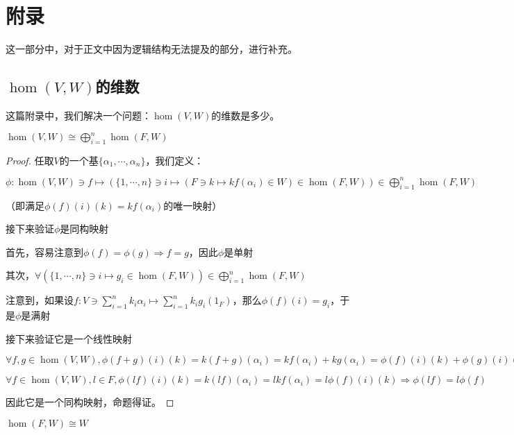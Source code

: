 \documentclass[12pt, a4paper, oneside, UTF8]{ctexbook}
\begin{document}
	\else
	\fi
	\chapter{附录}
	这一部分中，对于正文中因为逻辑结构无法提及的部分，进行补充。
		\section{$\hom(V,W)$的维数}
			这篇附录中，我们解决一个问题：$\hom(V,W)$的维数是多少。
			\begin{lemma}{}{}
				$\hom(V,W) \cong \bigoplus_{i=1}^{n} \hom(F,W)$
			\end{lemma}
			\begin{proof}
				任取$V$的一个基$\{\alpha_1,\cdots,\alpha_n\}$，我们定义：
						
				$\phi : \hom(V,W) \ni f \mapsto \left(\{1,\cdots,n\} \ni i \mapsto \left(F \ni k \mapsto kf(\alpha_i) \in W\right) \in \hom(F,W)\right) \in \bigoplus_{i=1}^{n} \hom(F,W)$
					
				（即满足$\phi (f)(i)(k)=kf(\alpha_i)$的唯一映射）
						
				接下来验证$\phi $是同构映射

				首先，容易注意到$\phi (f)=\phi (g) \Rightarrow f=g$，因此$\phi $是单射

				其次，$\forall \left(\{1,\cdots,n\} \ni i \mapsto g_i \in \hom(F,W)\right) \in \bigoplus_{i=1}^{n} \hom(F,W)$

				注意到，如果设$f:V \ni \sum\limits_{i=1}^{n} k_i \alpha_i \mapsto \sum\limits_{i=1}^{n} k_i g_i(1_F)$，那么$\phi (f)(i)=g_i$，于是$\phi $是满射

				接下来验证它是一个线性映射

				$\forall f,g \in \hom(V,W),\phi (f+g)(i)(k)=k(f+g)(\alpha_i)=kf(\alpha_i)+kg(\alpha_i)=\phi (f)(i)(k)+\phi (g)(i)(k) \Rightarrow \phi (f+g)=\phi (f)+\phi (g)$

				$\forall f \in \hom(V,W),l \in F,\phi (lf)(i)(k)=k(lf)(\alpha_i)=lkf(\alpha_i)=l\phi (f)(i)(k) \Rightarrow \phi (lf)=l\phi (f)$

				因此它是一个同构映射，命题得证。
			\end{proof}
			\begin{lemma}{}{}
				$\hom(F,W) \cong W$
			\end{lemma}
\end{document}
